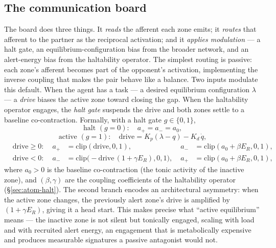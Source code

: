 \documentclass{article}
\begin{document}
\subsection{The communication board}\label{sec:atom-board}

The board does three things.  It \emph{reads} the afferent each zone
emits; it \emph{routes} that afferent to the partner as the reciprocal
activation; and it \emph{applies modulation} --- a halt gate, an
equilibrium-configuration bias from the broader network, and an
alert-energy bias from the haltability operator.  The simplest routing
is passive: each zone's afferent becomes part of the opponent's
activation, implementing the inverse coupling that makes the pair
behave like a balance.  Two inputs modulate this default.  When the
agent has a task --- a desired equilibrium configuration $\lambda$ ---
a \emph{drive} biases the active zone toward closing the gap.  When the
haltability operator engages, the \emph{halt gate} suspends the drive
and both zones settle to a baseline co-contraction.  Formally, with a
halt gate $g\in\{0,1\}$,
\begin{equation}
\text{halt } (g=0):\quad a_+ = a_- = a_0,
\label{eq:halt}
\end{equation}
\begin{equation}
\text{active } (g=1):\quad
\text{drive} = K_p(\lambda - q) - K_d\,\dot q,
\label{eq:drive}
\end{equation}
\begin{equation}
\begin{aligned}
&\text{drive}\geq 0:
&\;a_+ &= \mathrm{clip}(\text{drive},0,1),
&\;a_- &= \mathrm{clip}(a_0 + \beta E_R,0,1),\\
&\text{drive}<0:
&\;a_- &= \mathrm{clip}\bigl(-\text{drive}\,(1+\gamma E_R),0,1\bigr),
&\;a_+ &= \mathrm{clip}(a_0 + \beta E_R,0,1),
\end{aligned}
\label{eq:board}
\end{equation}
where $a_0>0$ is the baseline co-contraction (the tonic activity of
the inactive zone), and $(\beta,\gamma)$ are the coupling coefficients
of the haltability operator (\S\ref{sec:atom-halt}).  The second branch
encodes an architectural asymmetry: when the active zone changes, the
previously alert zone's drive is amplified by $(1+\gamma E_R)$, giving
it a head start.  This makes precise what ``active equilibrium'' means
--- the inactive zone is not silent but tonically engaged, scaling with
load and with recruited alert energy, an engagement that is
metabolically expensive and produces measurable signatures a passive
antagonist would not.
\end{document}
